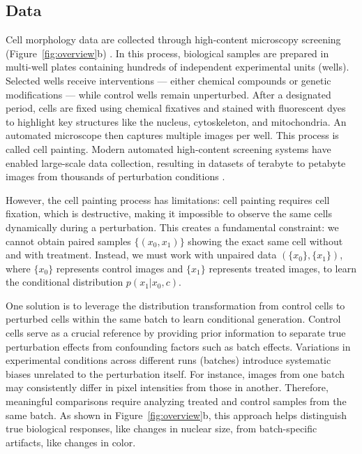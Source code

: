 \subsection{Data}

Cell morphology data are collected through high-content microscopy screening (Figure~\ref{fig:overview}b) \cite{perlman2004multidimensional}. In this process, biological samples are prepared in multi-well plates containing hundreds of independent experimental units (wells). Selected wells receive interventions --- either chemical compounds or genetic modifications --- while control wells remain unperturbed. After a designated period, cells are fixed using chemical fixatives and stained with fluorescent dyes to highlight key structures like the nucleus, cytoskeleton, and mitochondria. An automated microscope then captures multiple images per well. This process is called cell painting. Modern automated high-content screening systems have enabled large-scale data collection, resulting in datasets of terabyte to petabyte images from thousands of perturbation conditions \cite{fay2023rxrx3, chandrasekaran2023jump}.

However, the cell painting process has limitations: cell painting requires cell fixation, which is destructive, making it impossible to observe the same cells dynamically during a perturbation. This creates a fundamental constraint: we cannot obtain paired samples $\{(x_0, x_1)\}$ showing the exact same cell without and with treatment. Instead, we must work with unpaired data $(\{x_0\}, \{x_1\})$, where $\{x_0\}$ represents control images and $\{x_1\}$ represents treated images, to learn the conditional distribution $p(x_1 | x_0, c)$.

One solution is to leverage the distribution transformation from control cells to perturbed cells within the same batch to learn conditional generation. Control cells serve as a crucial reference by providing prior information to separate true perturbation effects from confounding factors such as batch effects. Variations in experimental conditions across different runs (batches) introduce systematic biases unrelated to the perturbation itself. For instance, images from one batch may consistently differ in pixel intensities from those in another. Therefore, meaningful comparisons require analyzing treated and control samples from the same batch. As shown in Figure~\ref{fig:overview}b, this approach helps distinguish true biological responses, like changes in nuclear size, from batch-specific artifacts, like changes in color.

